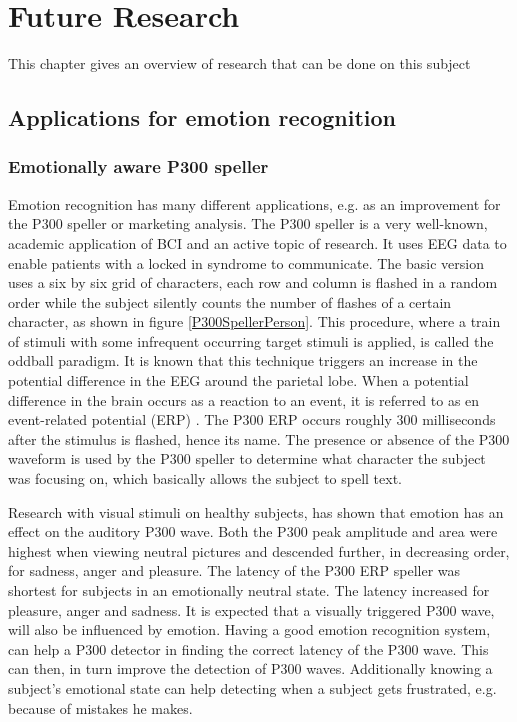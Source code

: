 \chapter{Future Research}
{\samenvatting This chapter gives an overview of research that can be done on this subject}

\section{Applications for emotion recognition}

\subsection{Emotionally aware P300 speller}

Emotion recognition has many different applications, e.g. as an improvement for the P300 speller or marketing analysis. The P300 speller is a very well-known, academic application of BCI and an active topic of research. It uses EEG data to enable patients with a locked in syndrome to communicate\cite{P300Origin}. The basic version uses a six by six grid of characters, each row and column is flashed in a random order while the subject silently counts the number of flashes of a certain character, as shown in figure \ref{P300SpellerPerson}. This procedure, where a train of stimuli with some infrequent occurring target stimuli is applied, is called the oddball paradigm\cite{PaperThibault}. It is known that this technique triggers an increase in the potential difference in the EEG around the parietal lobe. When a potential difference in the brain occurs as a reaction to an event, it is referred to as en event-related potential (ERP) . The P300 ERP occurs roughly 300 milliseconds after the stimulus is flashed, hence its name\citep{ComparisonClassifications}. The presence or absence of the P300 waveform is used by the P300 speller to determine what character the subject was focusing on, which basically allows the subject to spell text. 


Research with visual stimuli on healthy subjects, has shown that emotion has an effect on the auditory P300 wave\cite{AuditoryP300Effect}. Both the P300 peak amplitude and area were highest when viewing neutral pictures and descended further, in decreasing order, for sadness, anger and pleasure. The latency of the P300 ERP speller was shortest for subjects in an emotionally neutral state. The latency increased for pleasure, anger and sadness. It is expected that a visually triggered P300 wave, will also be influenced by emotion. Having a good emotion recognition system, can help a P300 detector in finding the correct latency of the P300 wave. This can then, in turn improve the detection of P300 waves. Additionally knowing a subject's emotional state can help detecting when a subject gets frustrated, e.g. because of mistakes he makes.

